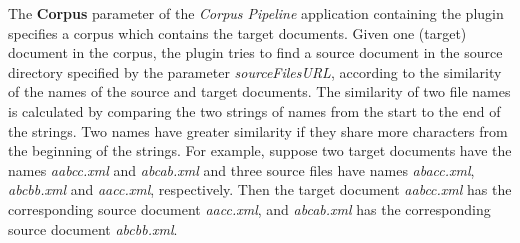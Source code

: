 The {\bf Corpus} parameter of the {\em Corpus Pipeline} application containing
the plugin specifies a corpus which contains the target documents. Given one
(target) document in the corpus, the plugin tries to find a source document in
the source directory specified by the parameter {\em sourceFilesURL},
according to the similarity of the names of the source and target documents.
The similarity of two file names is calculated by comparing the two strings of
names from the start to the end of the strings. Two names have greater
similarity if they share more characters from the beginning of the
strings. For example, suppose two target documents have the names {\em
  aabcc.xml} and {\em abcab.xml} and three source files have names
{\em abacc.xml}, {\em abcbb.xml} and {\em aacc.xml}, respectively. Then the
target document {\em aabcc.xml} has the corresponding source document {\em
  aacc.xml}, and {\em abcab.xml} has the corresponding source document {\em
  abcbb.xml}.

